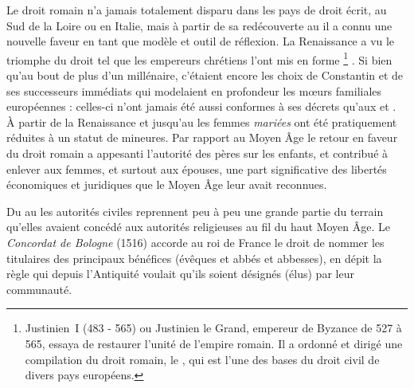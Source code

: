  Le droit romain n'a jamais totalement disparu dans les pays de droit écrit, au Sud de la Loire ou en Italie, mais à partir de sa redécouverte au  il a connu une nouvelle faveur en tant que modèle et outil de réflexion. La Renaissance a vu le triomphe du droit tel que les empereurs chrétiens l'ont mis en forme%
\footnote{Justinien~I\ier{} (483 - 565) ou Justinien le Grand, empereur de Byzance de 527 à 565, essaya de restaurer l'unité de l'empire romain. Il a ordonné et dirigé une compilation du droit romain, le , qui est l'une des bases du droit civil de divers pays européens.}%
. Si bien qu'au bout de plus d'un millénaire, c'étaient encore les choix de Constantin et de ses successeurs immédiats qui modelaient en profondeur les mœurs familiales européennes : celles-ci n'ont jamais été aussi conformes à ses décrets qu'aux  et . À partir de la Renaissance et jusqu'au  les femmes \emph{mariées} ont été pratiquement réduites à un statut de mineures. Par rapport au Moyen Âge le retour en faveur du droit romain a appesanti l'autorité des pères sur les enfants, et contribué à enlever aux femmes, et surtout aux épouses, une part significative des libertés économiques et juridiques que le Moyen Âge leur avait reconnues.

 Du  au  les autorités civiles reprennent peu à peu une grande partie du terrain qu'elles avaient concédé aux autorités religieuses au fil du haut Moyen Âge. Le \emph{Concordat de Bologne} (1516) accorde au roi de France le droit de nommer les titulaires des principaux bénéfices (évêques et abbés et abbesses), en dépit la règle qui depuis l'Antiquité voulait qu'ils soient désignés (élus) par leur communauté. 

